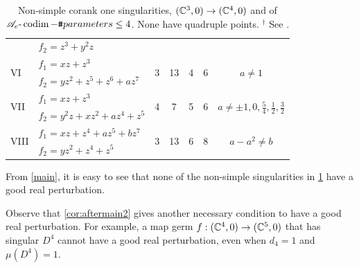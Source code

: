 \documentclass[a4paper,12pt]{amsart}
\begin{document}
\begin{table}[h]
{\begin{tabular}{ll|cc|cc|c}
                       & $f_2=z^3+y^2z$                  &                    &                     &                    &                    &                                                                     \\[3pt]
 \multirow{2}{*}{VI }   & $f_1=xz+z^3$                     & \multirow{2}{*}{3} & \multirow{2}{*}{13} & \multirow{2}{*}{4} & \multirow{2}{*}{6} & \multirow{2}{*}{$a\neq1$}                                           \\
                       & $f_2=yz^2+z^5+z^6+az^7$         &                    &                     &                    &                    &                                                                     \\[3pt]
 \multirow{2}{*}{VII }  & $f_1=xz+z^3$                     & \multirow{2}{*}{4} & \multirow{2}{*}{7}  & \multirow{2}{*}{5} & \multirow{2}{*}{6} & \multirow{2}{*}{$a\neq \pm1,0,\frac{5}{4},\frac{1}{2},\frac{3}{2}$} \\
                       & $f_2=y^2z+xz^2+az^4+z^5$        &                    &                     &                    &                    &                                                                     \\[3pt]
 \multirow{2}{*}{VIII } & $f_1=xz+z^4+az^5+bz^7$           & \multirow{2}{*}{3} & \multirow{2}{*}{13} & \multirow{2}{*}{6} & \multirow{2}{*}{8} & \multirow{2}{*}{$a-a^2\neq b$}                                      \\
                       & $f_2=yz^2+z^4+z^5$              &                    &                     &                    &                    &                                                                    
\end{tabular}
}
\caption{Non-simple corank one singularities, $(\mathbb{C}^3,0)\to(\mathbb{C}^4,0)$ and of $\mathscr{A}_e\text{-}\operatorname{codim}-\texttt{\#}parameters \leq 4$. None have quadruple points. $^\dagger$ See \cite[Appendix]{Houston1999a}.}
\label{tab:nonsimplec3c4}
\end{table}

From \cref{main}, it is easy to see that none of the non-simple singularities in \cref{tab:nonsimplec3c4} have a good real perturbation. 

\begin{remark}
Observe that \cref{cor:aftermain2} gives another necessary condition to have a good real perturbation. For example, a map germ $f:(\mathbb{C}^4,0)\to(\mathbb{C}^5,0)$ that has singular $D^4$ cannot have a good real perturbation, even when $d_4=1$ and $\mu(D^4)=1$.
\end{remark}





%
\end{document}
